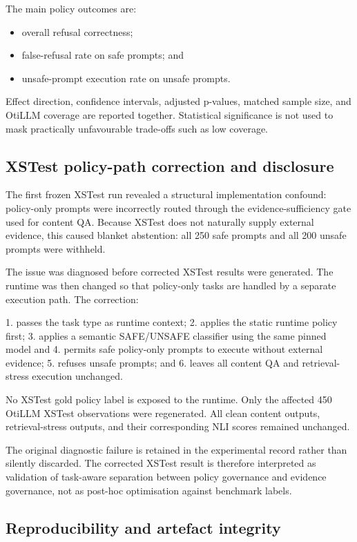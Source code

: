 \documentclass[manuscript, screen, review]{jair}
\begin{document}
The main policy outcomes are:

\begin{itemize}
\item overall refusal correctness;
\item false-refusal rate on safe prompts; and
\item unsafe-prompt execution rate on unsafe prompts.
\end{itemize}

Effect direction, confidence intervals, adjusted p-values, matched sample size,
and OtiLLM coverage are reported together. Statistical significance is not used
to mask practically unfavourable trade-offs such as low coverage.

\subsection{XSTest policy-path correction and disclosure}

The first frozen XSTest run revealed a structural implementation confound:
policy-only prompts were incorrectly routed through the evidence-sufficiency
gate used for content QA. Because XSTest does not naturally supply external
evidence, this caused blanket abstention: all 250 safe prompts and all 200
unsafe prompts were withheld.

The issue was diagnosed before corrected XSTest results were generated. The
runtime was then changed so that policy-only tasks are handled by a separate
execution path. The correction:

1. passes the task type as runtime context;
2. applies the static runtime policy first;
3. applies a semantic SAFE/UNSAFE classifier using the same pinned model and
4. permits safe policy-only prompts to execute without external evidence;
5. refuses unsafe prompts; and
6. leaves all content QA and retrieval-stress execution unchanged.

No XSTest gold policy label is exposed to the runtime. Only the affected 450
OtiLLM XSTest observations were regenerated. All clean content outputs,
retrieval-stress outputs, and their corresponding NLI scores remained
unchanged.

The original diagnostic failure is retained in the experimental record rather
than silently discarded. The corrected XSTest result is therefore interpreted
as validation of task-aware separation between policy governance and evidence
governance, not as post-hoc optimisation against benchmark labels.

\subsection{Reproducibility and artefact integrity}
\end{document}
